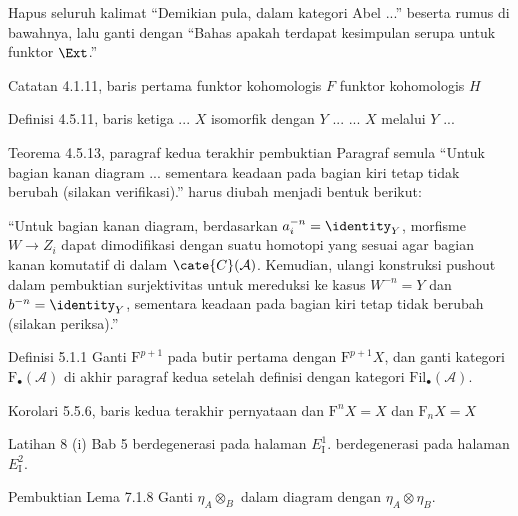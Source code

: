 \documentclass{AJerrata}
\begin{document}
\begin{Errata}
		Hapus seluruh kalimat ``Demikian pula, dalam kategori Abel ...'' beserta rumus di bawahnya, lalu ganti dengan ``Bahas apakah terdapat kesimpulan serupa untuk funktor $\Ext$.''
		
		\item[Catatan 4.1.11, baris pertama]
		\Orig funktor kohomologis $F$
		\Corr funktor kohomologis $H$
		
		\item[Definisi 4.5.11, baris ketiga]
		\Orig ... $X$ isomorfik dengan $Y$ ...
		\Corr ... $X$ melalui $Y$ ...
		
		\item[Teorema 4.5.13, paragraf kedua terakhir pembuktian]
		Paragraf semula ``Untuk bagian kanan diagram ... sementara keadaan pada bagian kiri tetap tidak berubah (silakan verifikasi).'' harus diubah menjadi bentuk berikut:
		
		``Untuk bagian kanan diagram, berdasarkan $a_i^{-n} = \identity_Y$, morfisme $W \to Z_i$ dapat dimodifikasi dengan suatu homotopi yang sesuai agar bagian kanan komutatif di dalam $\cate{C}(\mathcal{A})$. Kemudian, ulangi konstruksi pushout dalam pembuktian surjektivitas untuk mereduksi ke kasus $W^{-n} = Y$ dan $b^{-n} = \identity_Y$, sementara keadaan pada bagian kiri tetap tidak berubah (silakan periksa).''
		
		\item[Definisi 5.1.1]
		Ganti $\mathrm{F}^{p+1}$ pada butir pertama dengan $\mathrm{F}^{p+1} X$, dan ganti kategori $\mathrm{F}_{\bullet}(\mathcal{A})$ di akhir paragraf kedua setelah definisi dengan kategori $\mathrm{Fil}_{\bullet}(\mathcal{A})$.
		
		\item[Korolari 5.5.6, baris kedua terakhir pernyataan]
		\Orig dan $\mathrm{F}^n X = X$
		\Corr dan $\mathrm{F}_n X = X$
		
		\item[Latihan 8 (i) Bab 5]
		\Orig berdegenerasi pada halaman $E_{\mathrm{I}}^1$.
		\Corr berdegenerasi pada halaman $E_{\mathrm{I}}^2$.
		
		\item[Pembuktian Lema 7.1.8]
		Ganti $\eta_A \otimes_B$ dalam diagram dengan $\eta_A \otimes \eta_B$.
		

\end{Errata}
\end{document}
